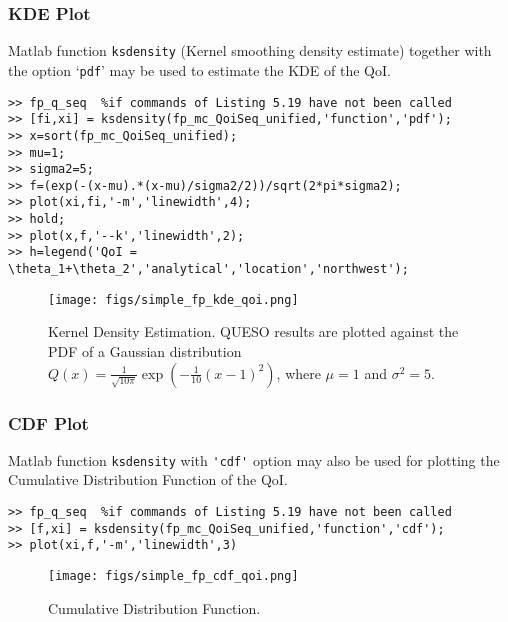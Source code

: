 \subsubsection{KDE Plot}

Matlab function \verb+ksdensity+ (Kernel smoothing density estimate) together with the option `\verb+pdf+' may be used to estimate the KDE of the QoI. 

\begin{lstlisting}[label=matlab:fp_kde_qoi,caption={Matlab code for the KDE displayed in Figure \ref{fig:simple_sfp_kde}}]
% inside Matlab
>> fp_q_seq  %if commands of Listing 5.19 have not been called
>> [fi,xi] = ksdensity(fp_mc_QoiSeq_unified,'function','pdf');
>> x=sort(fp_mc_QoiSeq_unified);
>> mu=1;
>> sigma2=5;
>> f=(exp(-(x-mu).*(x-mu)/sigma2/2))/sqrt(2*pi*sigma2);
>> plot(xi,fi,'-m','linewidth',4);
>> hold;
>> plot(x,f,'--k','linewidth',2);
>> h=legend('QoI = \theta_1+\theta_2','analytical','location','northwest');
\end{lstlisting}


\begin{figure}[p]
\centering 
\texttt{[image: figs/simple\_fp\_kde\_qoi.png]}
\vspace{-10pt}
\caption{Kernel Density Estimation. QUESO results are plotted against the PDF of a Gaussian distribution $Q(x)=   \frac{1}{ \sqrt{10\pi}} \exp\left(-\frac{1}{10}(x-1)^2 \right)$, where $\mu=1$ and $\sigma^2=5$.}
\label{fig:simple_sfp_kde}
\end{figure}


\subsubsection{CDF Plot}

Matlab function \verb+ksdensity+ with \verb+'cdf'+ option may also be used for plotting the Cumulative Distribution Function of the QoI.

\begin{lstlisting}[label=matlab:fp_cdf_qoi,caption={Matlab code for the QoI CDF plot displayed in Figure \ref{fig:simple_sfp_cdf}.}]
% inside Matlab
>> fp_q_seq  %if commands of Listing 5.19 have not been called
>> [f,xi] = ksdensity(fp_mc_QoiSeq_unified,'function','cdf');
>> plot(xi,f,'-m','linewidth',3)
\end{lstlisting}

\begin{figure}[p]
\centering 
\texttt{[image: figs/simple\_fp\_cdf\_qoi.png]}
\vspace*{-10pt}
\caption{Cumulative Distribution Function.}
\label{fig:simple_sfp_cdf}
\end{figure}
